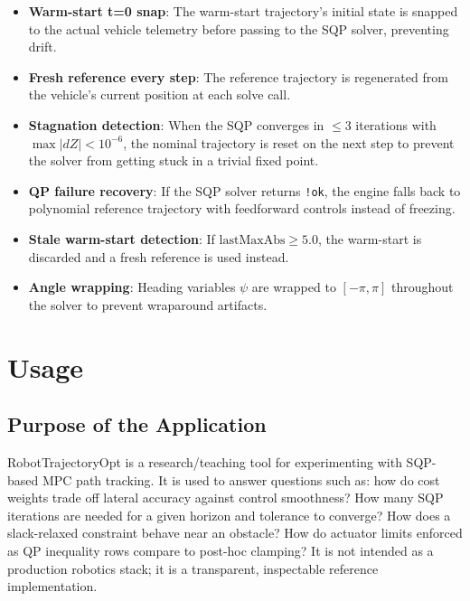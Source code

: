 ﻿\documentclass[11pt,a4paper]{article}
\begin{document}
\begin{itemize}[leftmargin=1.2cm]
  \item \textbf{Warm-start t=0 snap}: The warm-start trajectory's initial state is snapped to the actual vehicle telemetry before passing to the SQP solver, preventing drift.
  \item \textbf{Fresh reference every step}: The reference trajectory is regenerated from the vehicle's current position at each solve call.
  \item \textbf{Stagnation detection}: When the SQP converges in $\leq 3$ iterations with $\max|dZ| < 10^{-6}$, the nominal trajectory is reset on the next step to prevent the solver from getting stuck in a trivial fixed point.
  \item \textbf{QP failure recovery}: If the SQP solver returns \texttt{!ok}, the engine falls back to polynomial reference trajectory with feedforward controls instead of freezing.
  \item \textbf{Stale warm-start detection}: If $\text{lastMaxAbs} \geq 5.0$, the warm-start is discarded and a fresh reference is used instead.
  \item \textbf{Angle wrapping}: Heading variables $\psi$ are wrapped to $[-\pi, \pi]$ throughout the solver to prevent wraparound artifacts.
\end{itemize}
\section{Usage}

\subsection{Purpose of the Application}
RobotTrajectoryOpt is a research/teaching tool for experimenting with SQP-based MPC path tracking. It is used to answer questions such as: how do cost weights trade off lateral accuracy against control smoothness? How many SQP iterations are needed for a given horizon and tolerance to converge? How does a slack-relaxed constraint behave near an obstacle? How do actuator limits enforced as QP inequality rows compare to post-hoc clamping? It is not intended as a production robotics stack; it is a transparent, inspectable reference implementation.
\end{document}
